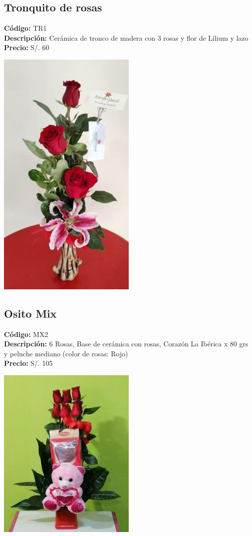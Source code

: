 \subsection*{Tronquito de rosas}
\textbf{Código:} TR1 \\
\textbf{Descripción:} Cerámica de tronco de madera con 3 rosas y flor de Lilium y lazo \\
\textbf{Precio:} S/. 60 \\
\begin{center}
\includegraphics[width=0.5\textwidth]{imagenes_extraidas/image_7_4}
\end{center}
\subsection*{Osito Mix}
\textbf{Código:} MX2 \\
\textbf{Descripción:} 6 Rosas, Base de cerámica con rosas, Corazón La Ibérica x 80 grs y peluche mediano (color de rosas: Rojo) \\
\textbf{Precio:} S/. 105 \\
\begin{center}
\includegraphics[width=0.5\textwidth]{imagenes_extraidas/image_7_3}
\end{center}
